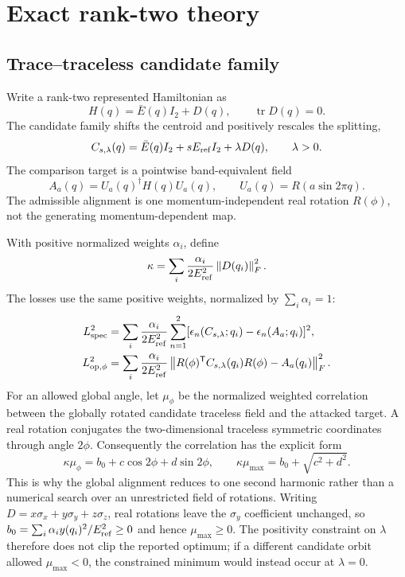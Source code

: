 \documentclass[11pt]{article}
\theoremstyle{definition}
\newcommand{\norm}[1]{\left\lVert#1\right\rVert}
\begin{document}
\section{Exact rank-two theory}

\subsection{Trace--traceless candidate family}

Write a rank-two represented Hamiltonian as
\begin{equation}
 H(q)=\bar E(q)I_2+D(q),\qquad \operatorname{tr}D(q)=0.
 \label{eq:trace-traceless}
\end{equation}
The candidate family shifts the centroid and positively rescales the splitting,
\begin{equation}
 C_{s,\lambda}(q)=\bar E(q)I_2+sE_{\rm ref}I_2+\lambda D(q),
 \qquad \lambda>0.
 \label{eq:candidate-rank2}
\end{equation}
The comparison target is a pointwise band-equivalent field
\begin{equation}
 A_a(q)=U_a(q)^\dagger H(q)U_a(q),
 \qquad U_a(q)=R(a\sin2\pi q).
 \label{eq:smooth-attack}
\end{equation}
The admissible alignment is one momentum-independent real rotation $R(\phi)$, not the
generating momentum-dependent map.

With positive normalized weights $\alpha_i$, define
\begin{equation}
 \kappa=\sum_i\frac{\alpha_i}{2E_{\rm ref}^2}\norm{D(q_i)}_F^2.
 \label{eq:kappa-main}
\end{equation}
The losses use the same positive weights, normalized by $\sum_i\alpha_i=1$:
\begin{align}
 L_{\rm spec}^2&=\sum_i\frac{\alpha_i}{2E_{\rm ref}^2}
 \sum_{n=1}^{2}[\epsilon_n(C_{s,\lambda};q_i)-\epsilon_n(A_a;q_i)]^2,\\
 L_{{\rm op},\phi}^2&=\sum_i\frac{\alpha_i}{2E_{\rm ref}^2}
 \norm{R(\phi)^\mathsf{T}C_{s,\lambda}(q_i)R(\phi)-A_a(q_i)}_F^2.
 \label{eq:rank2-loss-definitions}
\end{align}
For an allowed global angle, let $\mu_\phi$ be the normalized weighted correlation
between the globally rotated candidate traceless field and the attacked target.  A real
rotation conjugates the two-dimensional traceless symmetric coordinates through angle
$2\phi$.  Consequently the correlation has the explicit form
\begin{equation}
 \kappa\mu_\phi=b_0+c\cos2\phi+d\sin2\phi,
 \qquad
 \kappa\mu_{\max}=b_0+\sqrt{c^2+d^2}.
 \label{eq:second-harmonic-correlation}
\end{equation}
This is why the global alignment reduces to one second harmonic rather than a numerical
search over an unrestricted field of rotations.  Writing
$D=x\sigma_x+y\sigma_y+z\sigma_z$, real rotations leave the $\sigma_y$ coefficient
unchanged, so $b_0=\sum_i\alpha_i y(q_i)^2/E_{\rm ref}^2\ge0$ and hence
$\mu_{\max}\ge0$.  The positivity constraint on $\lambda$ therefore does not clip the
reported optimum; if a different candidate orbit allowed $\mu_{\max}<0$, the constrained
minimum would instead occur at $\lambda=0$.
\end{document}
